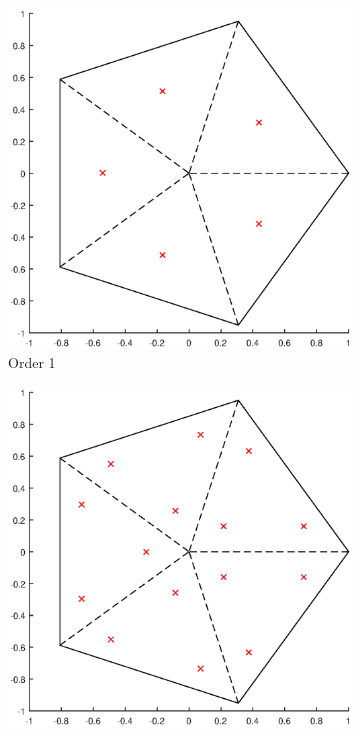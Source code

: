 \begin{figure}
\centering
{
	\begin{subfigure}[b]{0.475\textwidth}
		\centering
		\label{subfig::2DInt_V5_Q1}
		\includegraphics[width=\textwidth]{figures/sec_BF/V5_Q1.eps}
		\caption{Order 1}
	\end{subfigure}
	\hfill
	\begin{subfigure}[b]{0.475\textwidth}
		\centering
		\label{subfig::2DInt_V5_Q2}
		\includegraphics[width=\textwidth]{figures/sec_BF/V5_Q2.eps}

\end{subfigure}}
\end{figure}
